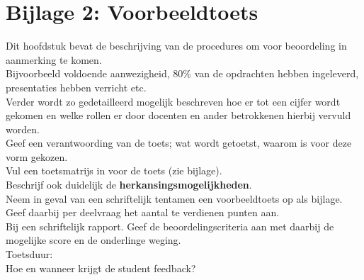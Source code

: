 \section*{Bijlage 2: Voorbeeldtoets}

		Dit hoofdstuk bevat de beschrijving van de procedures om voor beoordeling in aanmerking te komen.\\
		Bijvoorbeeld voldoende aanwezigheid, 80\% van de opdrachten hebben ingeleverd, presentaties hebben verricht etc.\\

		Verder wordt zo gedetailleerd mogelijk beschreven hoe er tot een cijfer wordt gekomen en welke rollen er door docenten en ander betrokkenen hierbij vervuld worden. \\

		Geef een verantwoording van de toets; wat wordt getoetst, waarom is voor deze vorm gekozen.\\

		Vul een toetsmatrijs in voor de toets (zie bijlage).\\

		Beschrijf ook duidelijk de \textbf{herkansingsmogelijkheden}. \\

		Neem in geval van een schriftelijk tentamen een voorbeeldtoets op als bijlage.\\
		Geef daarbij per deelvraag het aantal te verdienen punten aan. \\

		Bij een schriftelijk rapport. Geef de beoordelingscriteria aan met daarbij de mogelijke score en de onderlinge weging. \\

		Toetsduur: \\

		Hoe en wanneer krijgt de student feedback?\\